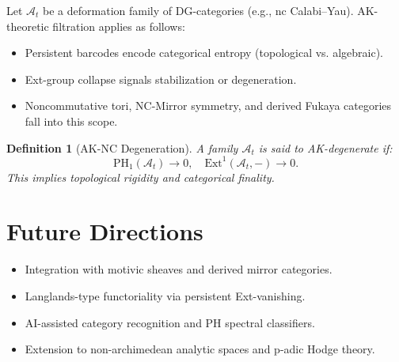 \documentclass[11pt]{article}
\newtheorem{definition}[theorem]{Definition}
\begin{document}
Let \( \mathcal{A}_t \) be a deformation family of DG-categories (e.g., nc Calabi–Yau).  
AK-theoretic filtration applies as follows:

\begin{itemize}
    \item Persistent barcodes encode categorical entropy (topological vs. algebraic).
    \item Ext-group collapse signals stabilization or degeneration.
    \item Noncommutative tori, NC-Mirror symmetry, and derived Fukaya categories fall into this scope.
\end{itemize}

\begin{definition}[AK-NC Degeneration]
A family \( \mathcal{A}_t \) is said to AK-degenerate if:
\[
\mathrm{PH}_1(\mathcal{A}_t) \to 0, \quad \mathrm{Ext}^1(\mathcal{A}_t, -) \to 0.
\]
This implies topological rigidity and categorical finality.
\end{definition}


\section{Future Directions}

\begin{itemize}
    \item Integration with motivic sheaves and derived mirror categories.
    \item Langlands-type functoriality via persistent Ext-vanishing.
    \item AI-assisted category recognition and PH spectral classifiers.
    \item Extension to non-archimedean analytic spaces and p-adic Hodge theory.
\end{itemize}
\end{document}
